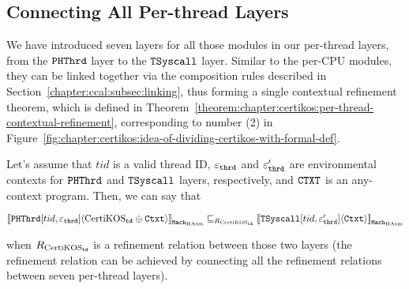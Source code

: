 \subsection{Connecting All Per-thread Layers}
\label{chapter:certikos:subsec:connecting-all-thread-layers}

We have introduced seven layers for all those modules in our per-thread layers, from the ${{\mathrm{\texttt{PHThrd}}}}$ layer to the 
${{\mathrm{\texttt{TSyscall}}}}$ layer.
Similar to the per-CPU modules, they  can be linked together via the composition rules described in Section~\ref{chapter:ccal:subsec:linking},
thus forming a single contextual refinement theorem, which is defined in Theorem~\ref{theorem:chapter:certikos:per-thread-contextual-refinement},
corresponding to  number (2) in Figure~\ref{fig:chapter:certikos:idea-of-dividing-certikos-with-formal-def}.
\begin{theorem}
\label{theorem:chapter:certikos:per-thread-contextual-refinement}
Let's assume that $tid$ is a valid thread ID, ${\varepsilon}_{{\mathrm{\texttt{thrd}}}}$ and  ${\varepsilon}'_{{\mathrm{\texttt{thrd}}}}$ are environmental contexts for 
${{\mathrm{\texttt{PHThrd}}}}$  and ${{\mathrm{\texttt{TSyscall}}}}$ layers, respectively, and ${\mathrm{\texttt{CTXT}}}$ is an any-context program. Then, we can say that
\begin{center}
${[\![{{{\mathrm{\texttt{PHThrd}}}}[tid, {\varepsilon}_{{\mathrm{\texttt{thrd}}}}]} \langle {\mathrm{CertiKOS}_{{\mathrm{\texttt{td}}}} \oplus {\mathrm{\texttt{Ctxt}}}} \rangle]\!]}_{{\mathrm{\texttt{Mach}}}_{\mathrm{HAsm}}} \sqsubseteq_{R_{\mathrm{CertiKOS}_{\mathrm{\texttt{td}}}}} {[\![{{{\mathrm{\texttt{TSyscall}}}}[tid, {\varepsilon}'_{{\mathrm{\texttt{thrd}}}}]} \langle {{\mathrm{\texttt{Ctxt}}}} \rangle]\!]}_{{\mathrm{\texttt{Mach}}}_{\mathrm{HAsm}}}$
\end{center}
when ${R_{\mathrm{CertiKOS}_{\mathrm{\texttt{td}}}}}$ is a refinement relation between those two layers (the refinement relation can be achieved by 
connecting all the refinement relations  between seven per-thread layers).
\end{theorem}


